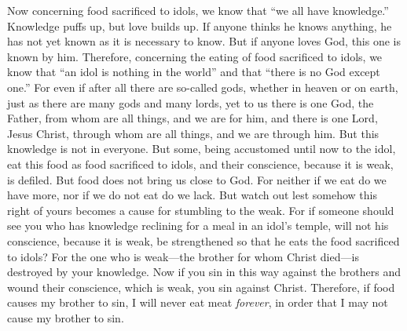 \begin{biblechapter} %
 Now concerning food sacrificed to idols, we know that “we all have knowledge.” Knowledge puffs up, but love builds up.
\verse If anyone thinks he knows anything, he has not yet known as it is necessary to know.
\verse But if anyone loves God, this one is known by him.
\verse Therefore, concerning the eating of food sacrificed to idols, we know that “an idol is nothing in the world” and that “there is no God except one.”
\verse For even if after all there are so-called gods, whether in heaven or on earth, just as there are many gods and many lords,
\verse yet to us there is one God, the Father, 
from whom are all things, and we are for him, 
and there is one Lord, Jesus Christ, 
through whom are all things, and we are through him.
\verse But this knowledge is not in everyone. But some, being accustomed until now to the idol, eat this food as food sacrificed to idols, and their conscience, because it is weak, is defiled.
\verse But food does not bring us close to God. For neither if we eat do we have more, nor if we do not eat do we lack.
\verse But watch out lest somehow this right of yours becomes a cause for stumbling to the weak.
\verse For if someone should see you who has knowledge reclining for a meal in an idol’s temple, will not his conscience, because it is weak, be strengthened so that he eats the food sacrificed to idols?
\verse For the one who is weak—the brother for whom Christ died—is destroyed by your knowledge.
\verse Now if you sin in this way against the brothers and wound their conscience, which is weak, you sin against Christ.
\verse Therefore, if food causes my brother to sin, I will never eat meat \textit{forever}, in order that I may not cause my brother to sin.
\end{biblechapter}

